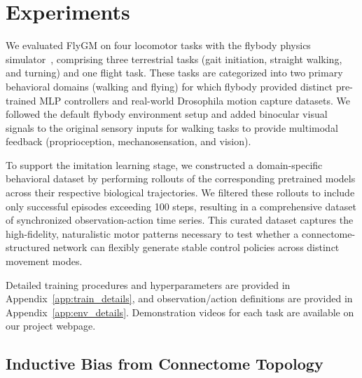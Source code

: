 \documentclass{article}
\theoremstyle{plain}
\theoremstyle{definition}
\theoremstyle{remark}
\begin{document}
\section{Experiments}

We evaluated FlyGM on four locomotor tasks with the flybody physics simulator~\citep{Vaxenburg2025}, comprising three terrestrial tasks (gait initiation, straight walking, and turning) and one flight task. These tasks are categorized into two primary behavioral domains (walking and flying) for which flybody provided distinct pre-trained MLP controllers and real-world Drosophila motion capture datasets. We followed the default flybody environment setup and added binocular visual signals to the original sensory inputs for walking tasks to provide multimodal feedback (proprioception, mechanosensation, and vision).

To support the imitation learning stage, we constructed a domain-specific behavioral dataset by performing rollouts of the corresponding pretrained models across their respective biological trajectories. We filtered these rollouts to include only successful episodes exceeding 100 steps, resulting in a comprehensive dataset of synchronized observation-action time series. This curated dataset captures the high-fidelity, naturalistic motor patterns necessary to test whether a connectome-structured network can flexibly generate stable control policies across distinct movement modes.

Detailed training procedures and hyperparameters are provided in Appendix~\ref{app:train_details}, and observation/action definitions are provided in Appendix~\ref{app:env_details}. Demonstration videos for each task are available on our project webpage.

\subsection{Inductive Bias from Connectome Topology}
\label{sec:inductive_bias}
\end{document}
